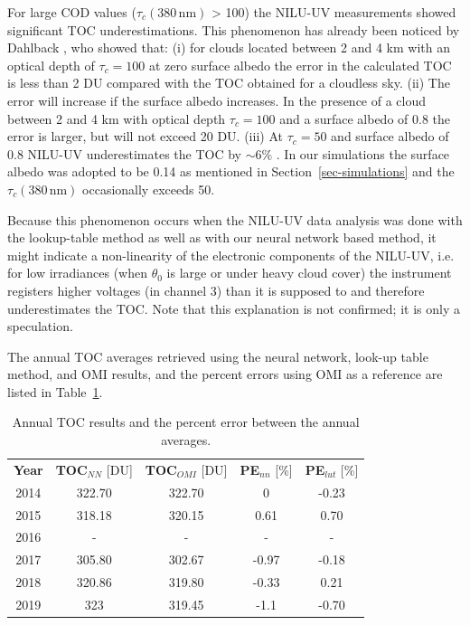 \documentclass{optica-article}
\begin{document}
For large COD values ($\tau_c{\scriptstyle(380 \, \text{nm})}$ > 100) the NILU-UV measurements showed significant TOC underestimations.
This phenomenon has already been noticed by Dahlback \cite{Dahlback:1996}, who showed that: 
(i) for clouds located between 2 and 4 km with an optical depth of $\tau_c=100$ at zero surface albedo the error in the calculated TOC is less than 2 DU compared with the TOC obtained for a cloudless sky. 
(ii) The error will increase if the surface albedo increases. In the presence of a cloud between 2 and 4 km with optical depth 
$\tau_c=100$ and a surface albedo of 0.8 the error is larger, but will not exceed 20 DU. 
(iii) At $\tau_c=50$ and surface albedo of 0.8 NILU-UV underestimates the TOC by $\sim 6\%$ \cite{Dahlback:2003}. 
In our simulations the surface albedo was adopted to be 0.14 as mentioned in Section~\ref{sec-simulations} and the $\tau_c{\scriptstyle(380 \, \text{nm})}$ occasionally exceeds 50.

Because this phenomenon occurs when the NILU-UV data analysis was done with the lookup-table method as well as with our neural network based method, it might indicate a non-linearity of the electronic components of the NILU-UV, i.e. for low irradiances (when $\theta_0$ is large or under heavy cloud cover) the instrument registers higher voltages (in channel 3) than 
it is supposed to and therefore underestimates the TOC. 
Note that this explanation is not confirmed; it is only a speculation. 

The annual TOC averages retrieved using the neural network, look-up table method, and OMI results, and the percent errors using OMI as a reference are listed in Table~\ref{tab:annualstats}.

\begin{table}
	\centering
	\begin{tabular}{|c|c|c|c|c|}
		\hline
		\textbf{Year} & \textbf{TOC}$_{NN}$ [DU] & \textbf{TOC}$_{OMI}$ [DU]   & \textbf{PE}$_{nn}$ [\%] & \textbf{PE}$_{lut}$ [\%]  \\
		\Xhline{2\arrayrulewidth}
		2014 & 322.70 & 322.70 & 0 & -0.23 \\
		\hline
		2015 & 318.18 & 320.15 & 0.61 & 0.70 \\
		\hline
		2016 & - & - & - & - \\
		\hline
		2017 & 305.80 & 302.67 & -0.97 & -0.18 \\
		\hline
		2018 & 320.86 & 319.80 & -0.33 & 0.21 \\
		\hline
		2019 & 323 &  319.45 & -1.1 & -0.70 \\
		\hline
	\end{tabular}
	\caption{Annual TOC results and the percent error between the annual averages.}
	\label{tab:annualstats}
\end{table}
\end{document}
